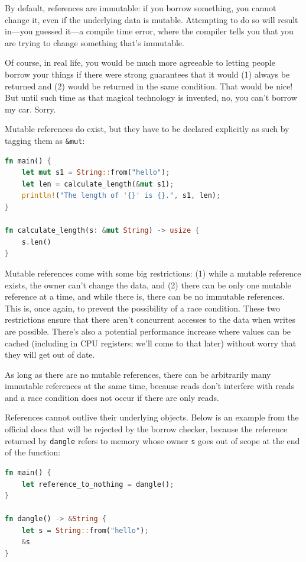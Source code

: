 \documentclass[a4paper]{report}
\begin{document}
By default, references are immutable: if you borrow something, you cannot change it, even if the underlying data is mutable. Attempting to do so will result in---you guessed it---a compile time error, where the compiler tells you that you are trying to change something that's immutable. 

Of course, in real life, you would be much more agreeable to letting people borrow your things if there were strong guarantees that it would (1) always be returned and (2) would be returned in the same condition. That would be nice! But until such time as that magical technology is invented, no, you can't borrow my car. Sorry.

Mutable references do exist, but they have to be declared explicitly as such by tagging them as \texttt{\&mut}:

\begin{lstlisting}[language=Rust]
fn main() {
    let mut s1 = String::from("hello");
    let len = calculate_length(&mut s1);
    println!("The length of '{}' is {}.", s1, len);
}

fn calculate_length(s: &mut String) -> usize {
    s.len()
}
\end{lstlisting}

Mutable references come with  some big restrictions: (1) while a mutable reference exists, the owner can't change the data, and (2) there can be only one mutable reference at a time, and while there is, there can be no immutable references. This is, once again, to prevent the possibility of a race condition. These two restrictions ensure that there aren't concurrent accesses to the data when writes are possible. There's also a potential performance increase where values can be cached (including in CPU registers; we'll come to that later) without worry that they will get out of date.

As long as there are no mutable references, there can be arbitrarily many immutable references at the same time, because reads don't interfere with reads and a race condition does not occur if there are only reads. 

References cannot outlive their underlying objects. Below is an example from the official docs that will be rejected by the borrow checker, because the reference returned by \texttt{dangle} refers to memory whose owner \texttt{s} goes out of scope at the end of the function:

\begin{lstlisting}[language=Rust]
fn main() {
    let reference_to_nothing = dangle();
}

fn dangle() -> &String {
    let s = String::from("hello");
    &s
}
\end{lstlisting} 
\end{document}
